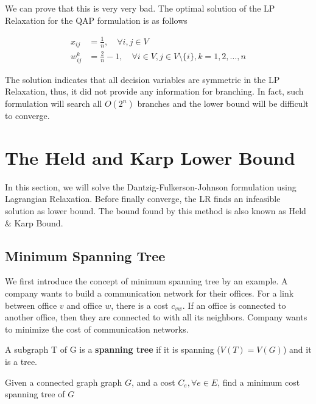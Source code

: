            We can prove that this is very very bad. The optimal solution of the LP Relaxation for the QAP formulation is as follows

            \begin{align}
                x_{ij} &= \frac{1}{n}, \quad \forall i, j \in V\\
                w_{ij}^k &= \frac{2}{n} - 1, \quad \forall i \in V, j \in V \setminus \{i\}, k = 1, 2, \ldots, n
            \end{align}

            The solution indicates that all decision variables are symmetric in the LP Relaxation, thus, it did not provide any information for branching. In fact, such formulation will search all $O(2^n)$ branches and the lower bound will be difficult to converge.
    
    \section{The Held and Karp Lower Bound}
        In this section, we will solve the Dantzig-Fulkerson-Johnson formulation using Lagrangian Relaxation. Before finally converge, the LR finds an infeasible solution as lower bound. The bound found by this method is also known as Held \& Karp Bound.
        
        \subsection{Minimum Spanning Tree}
            We first introduce the concept of minimum spanning tree by an example. A company wants to build a communication network for their offices. For a link between office $v$ and office $w$, there is a cost $c_{vw}$. If an office is connected to another office, then they are connected to with all its neighbors. Company wants to minimize the cost of communication networks.

            \begin{definition}
                A subgraph T of G is a \textbf{spanning tree} if it is spanning ($V(T)=V(G)$) and it is a tree.
            \end{definition}

            \begin{definition}
                Given a connected graph graph $G$, and a cost $C_e, \forall e\in E$, find a minimum cost spanning tree of $G$
            \end{definition}

